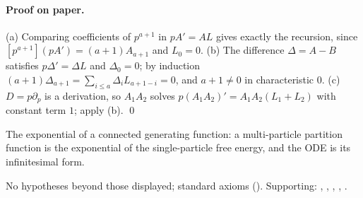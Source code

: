 \paragraph{Proof on paper.}  (a) Comparing coefficients of $p^{a+1}$ in $pA'=AL$ gives exactly the recursion, since
$[p^{a+1}](pA')=(a+1)A_{a+1}$ and $L_0=0$.  (b) The difference $\Delta=A-B$ satisfies $p\Delta'=\Delta L$ and $\Delta_0=0$; by
induction $(a+1)\Delta_{a+1}=\sum_{i\le a}\Delta_iL_{a+1-i}=0$, and $a+1\ne0$ in characteristic $0$.  (c) $D=p\partial_p$ is a
derivation, so $A_1A_2$ solves $p(A_1A_2)'=A_1A_2(L_1+L_2)$ with constant term $1$; apply (b). \qed
\begin{physics}
The exponential of a connected generating function: a multi-particle partition function is the exponential of the
single-particle free energy, and the ODE is its infinitesimal form.
\end{physics}
\begin{status}No hypotheses beyond those displayed; standard axioms ().  Supporting:
, , , ,
.\end{status}

